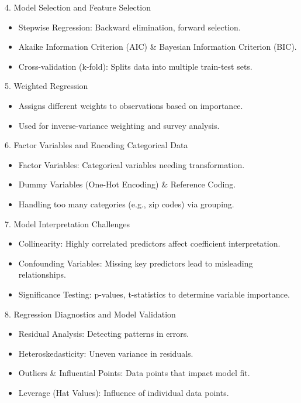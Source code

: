 \documentclass{beamer}
\begin{document}
\begin{frame}{4. Model Selection and Feature Selection}
    \begin{itemize}
        \item Stepwise Regression: Backward elimination, forward selection.
        \item Akaike Information Criterion (AIC) & Bayesian Information Criterion (BIC).
        \item Cross-validation (k-fold): Splits data into multiple train-test sets.
    \end{itemize}
\end{frame}

\begin{frame}{5. Weighted Regression}
    \begin{itemize}
        \item Assigns different weights to observations based on importance.
        \item Used for inverse-variance weighting and survey analysis.
    \end{itemize}
\end{frame}

\begin{frame}{6. Factor Variables and Encoding Categorical Data}
    \begin{itemize}
        \item Factor Variables: Categorical variables needing transformation.
        \item Dummy Variables (One-Hot Encoding) & Reference Coding.
        \item Handling too many categories (e.g., zip codes) via grouping.
    \end{itemize}
\end{frame}

\begin{frame}{7. Model Interpretation Challenges}
    \begin{itemize}
        \item Collinearity: Highly correlated predictors affect coefficient interpretation.
        \item Confounding Variables: Missing key predictors lead to misleading relationships.
        \item Significance Testing: p-values, t-statistics to determine variable importance.
    \end{itemize}
\end{frame}

\begin{frame}{8. Regression Diagnostics and Model Validation}
    \begin{itemize}
        \item Residual Analysis: Detecting patterns in errors.
        \item Heteroskedasticity: Uneven variance in residuals.
        \item Outliers & Influential Points: Data points that impact model fit.
        \item Leverage (Hat Values): Influence of individual data points.
    \end{itemize}
\end{frame}
\end{document}
